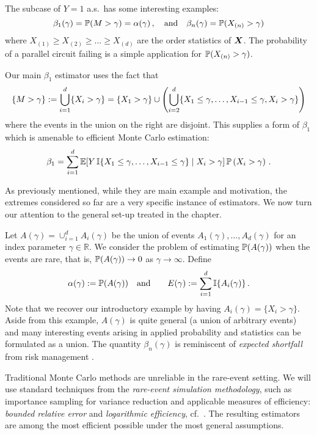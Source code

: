 The subcase of $Y=1$ a.s.\ has some interesting examples:
\[ \beta_1(\gamma) = \operatorname{{\mathbb P}}(M > \gamma) = \alpha(\gamma) \,, \quad \text{and} \quad
 \beta_n(\gamma) = \operatorname{{\mathbb P}}(X_{(n)} > \gamma) \]
where $X_{(1)} \ge X_{(2)} \ge \dots \ge X_{(d)}$ are the order statistics of $\bm{X}$. The probability of a parallel circuit failing is a simple application for $\operatorname{{\mathbb P}}(X_{(n)} > \gamma)$.

Our main $\beta_1$ estimator uses the fact that
\begin{align} \label{extreme-first-partition}
\{M > \gamma\}  := \bigcup_{i=1}^d \{X_i > \gamma\} = \{X_1 > \gamma\} \cup \left( \bigcup_{i=2}^d \{X_1 \le \gamma, \dots, X_{i-1} \le \gamma, X_i > \gamma\} \right)
\end{align}
where the events in the union on the right are disjoint.
This supplies a form of $\beta_1$ which is amenable to efficient Monte Carlo estimation:
\begin{equation} \label{extreme-beta_1}
 \beta_1=\sum_{i=1}^d \operatorname{{\mathbb E}} [ Y \, \mathbb{I}\{ X_1 \le \gamma, \dots, X_{i-1} \le \gamma  \} \mid X_i > \gamma ] \operatorname{{\mathbb P}}\left(X_i > \gamma \right) \,.
\end{equation}

As previously mentioned, while they are main example and motivation, the extremes considered so far are a very specific instance of estimators. We now
turn our attention to the general set-up treated in the chapter.

Let $A(\gamma) = \cup_{i=1}^d A_i(\gamma)$ be the union of events $A_1(\gamma),\dots,A_d(\gamma)$ for an index parameter $\gamma \in \mathbb{R}$.
    We consider the problem of estimating $\operatorname{{\mathbb P}} ( A(\gamma) ) $ when the events are rare, that is, $\operatorname{{\mathbb P}}(A(\gamma)) \to 0$ as $\gamma \to \infty$.
Define
\[ \alpha(\gamma) := \operatorname{{\mathbb P}} ( A(\gamma) ) \quad \text{and} \quad \quad E(\gamma) := \sum_{i=1}^d \mathbb{I}\{ A_i(\gamma) \} \, .
\]
Note that we recover our introductory example by having
$A_i(\gamma) = \{X_i > \gamma\}$. Aside from this example, $A(\gamma)$ is quite general (a union of arbitrary events)
and many interesting events arising in applied probability and statistics can be
formulated as a union. The quantity $\beta_n(\gamma)$ is reminiscent of \emph{expected shortfall} from risk management \cite{mcneil2015quantitative}.

Traditional Monte Carlo methods are unreliable in the rare-event setting. We will use standard techniques from the \emph{rare-event simulation methodology}, such as importance sampling for variance reduction and applicable
measures of efficiency: \emph{bounded relative error} and \emph{logarithmic efficiency}, cf.\ \cite{asmussen2007stochastic,glasserman2003monte,rubinstein2011simulation}. The resulting estimators are among the most efficient possible under the
most general assumptions.

